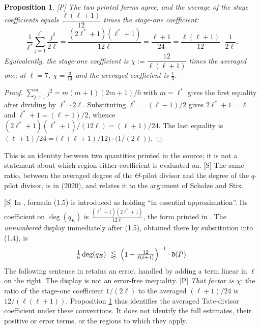 \documentclass[11pt]{article}
\theoremstyle{plain}
\newtheorem{proposition}{Proposition}
\theoremstyle{definition}
\begin{document}
\begin{proposition}\label{p:chi}
\textup{[P]} The two printed forms agree, and the average of the stage
coefficients equals $\dfrac{\ell(\ell+1)}{12}$ times the stage-one coefficient:
\[
 \frac1{\ell^{*}}\sum_{j=1}^{\ell^{*}}\frac{j^2}{2\ell}
 =\frac{(2\ell^{*}+1)(\ell^{*}+1)}{12\ell}
 =\frac{\ell+1}{24}
 =\frac{\ell(\ell+1)}{12}\cdot\frac1{2\ell}.
\]
Equivalently, the stage-one coefficient is
$\chi:=\dfrac{12}{\ell(\ell+1)}$ times the averaged one; at $\ell=7$,
$\chi=\tfrac3{14}$ and the averaged coefficient is $\tfrac13$.
\end{proposition}

\begin{proof}
$\sum_{j=1}^{m}j^2=m(m+1)(2m+1)/6$ with $m=\ell^{*}$ gives the first equality after
dividing by $\ell^{*}\cdot2\ell$.  Substituting $\ell^{*}=(\ell-1)/2$ gives
$2\ell^{*}+1=\ell$ and $\ell^{*}+1=(\ell+1)/2$, whence
$(2\ell^{*}+1)(\ell^{*}+1)/(12\ell)=(\ell+1)/24$.  The last equality is
$(\ell+1)/24=\bigl(\ell(\ell+1)/12\bigr)\cdot\bigl(1/(2\ell)\bigr)$.
\end{proof}

This is an identity between two quantities printed in the source; it is not a
statement about which region either coefficient is evaluated on.  \textup{[S]} The same
ratio, between the averaged degree of the $\Theta$-pilot divisor and the degree of the
$q$-pilot divisor, is in \cite[\S3.8, (3.3)]{DHPS} (2020), and
\cite[Rem.~3.8.3(1)]{DHPS} relates it to the argument of Scholze and Stix.

\textup{[S]} In \cite[\S1.3, p.~4]{SS}, formula (1.5) is introduced as holding
``in essential approximation''.  Its coefficient on $\deg(q_E)$ is
$\frac{(\ell^{*}+1)(2\ell^{*}+1)}{12\ell}$, the form printed in
\cite[Thm.~1.10, Step (v)]{IUT4}.  The \emph{unnumbered} display immediately after
(1.5), obtained there by substitution into (1.4), is
\[
 \tfrac16\deg(q_E)\ \lessapprox\ \Bigl(1-\tfrac{12}{\ell(\ell+1)}\Bigr)^{-1}\cdot\mathfrak d(P).
\]
The following sentence in \cite[p.~4]{SS} retains an error, handled by adding a
term linear in $\ell$ on the right.  The display is not an error-free inequality.
\textup{[P]} \emph{That factor is $\chi$}: the ratio of the stage-one coefficient
$1/(2\ell)$ to the averaged $(\ell+1)/24$ is $12/(\ell(\ell+1))$.  Proposition
\ref{p:chi} thus identifies the averaged Tate-divisor coefficient under these
conventions.  It does not identify the full estimates, their positive or error
terms, or the regions to which they apply.
\end{document}
